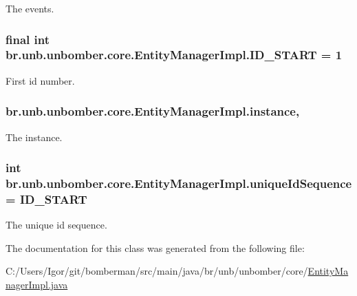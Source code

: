 The events. 

\hypertarget{classbr_1_1unb_1_1unbomber_1_1core_1_1_entity_manager_impl_aa31f25455e28eaa6be62c4f7133bc96f}{
\subsubsection[{I\+D\+\_\+\+S\+T\+A\+R\+T}]{\setlength{\rightskip}{0pt plus 5cm}final int br.\+unb.\+unbomber.\+core.\+Entity\+Manager\+Impl.\+I\+D\+\_\+\+S\+T\+A\+R\+T = 1\hspace{0.3cm}{\ttfamily [private]}}}\label{classbr_1_1unb_1_1unbomber_1_1core_1_1_entity_manager_impl_aa31f25455e28eaa6be62c4f7133bc96f}


First id number. 

\hypertarget{classbr_1_1unb_1_1unbomber_1_1core_1_1_entity_manager_impl_aa71f291d783253d1fba632baad1985f0}{
\subsubsection[{instance}]{ br.\+unb.\+unbomber.\+core.\+Entity\+Manager\+Impl.\+instance\hspace{0.3cm}{\ttfamily [static]}, {\ttfamily [private]}}}\label{classbr_1_1unb_1_1unbomber_1_1core_1_1_entity_manager_impl_aa71f291d783253d1fba632baad1985f0}


The instance. 

\hypertarget{classbr_1_1unb_1_1unbomber_1_1core_1_1_entity_manager_impl_a68e7d8adbdf22a16de5f28264c6312a8}{
\subsubsection[{unique\+Id\+Sequence}]{\setlength{\rightskip}{0pt plus 5cm}int br.\+unb.\+unbomber.\+core.\+Entity\+Manager\+Impl.\+unique\+Id\+Sequence = {\bf I\+D\+\_\+\+S\+T\+A\+R\+T}\hspace{0.3cm}{\ttfamily [private]}}}\label{classbr_1_1unb_1_1unbomber_1_1core_1_1_entity_manager_impl_a68e7d8adbdf22a16de5f28264c6312a8}


The unique id sequence. 



The documentation for this class was generated from the following file\+:\begin{DoxyCompactItemize}
\item 
C\+:/\+Users/\+Igor/git/bomberman/src/main/java/br/unb/unbomber/core/\hyperlink{_entity_manager_impl_8java}{Entity\+Manager\+Impl.\+java}\end{DoxyCompactItemize}

